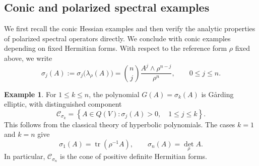 \documentclass[oneside,english,letterpaper]{amsart}
\numberwithin{equation}{section}
\theoremstyle{plain}
\theoremstyle{definition}
\newtheorem{example}[thm]{Example}
\theoremstyle{remark}
\begin{document}
\subsection{Conic and polarized spectral examples}
\label{subsec:K-Garding-examples}

We first recall the conic Hessian examples and then verify the
analytic properties of polarized spectral operators directly.
We conclude with conic examples depending on fixed Hermitian forms. With respect to the reference form $\rho$ fixed
above, we write
$$
\sigma_j(A):=\sigma_j\bigl(\lambda_\rho(A)\bigr)
=\binom{n}{j}\frac{A^j\wedge\rho^{n-j}}{\rho^n},
\qquad 0\leq j\leq n.
$$

\begin{example}
\label{example:sigma-k-K-Garding}
\label{example:determinant-K-Garding}
For $1\leq k\leq n$, the polynomial $G(A)=\sigma_k(A)$ is
G{\aa}rding elliptic, with distinguished component
$$
\mathcal C_{\sigma_k}
=\left\{A\in Q(V):\sigma_j(A)>0,\quad 1\leq j\leq k\right\}.
$$
This follows from the classical theory of hyperbolic polynomials.
The cases $k=1$ and $k=n$ give
$$
\sigma_1(A)=\operatorname{tr}(\rho^{-1}A),
\qquad
\sigma_n(A)=\det_\rho A.
$$
In particular, $\mathcal C_{\sigma_n}$ is the cone of positive
definite Hermitian forms.
\end{example}
\end{document}
